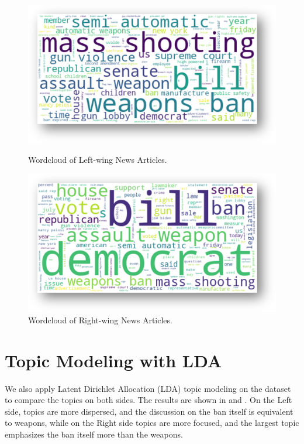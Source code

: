 \begin{figure}[ht]
    \centering
    \begin{minipage}[b]{0.45\textwidth}
        \includegraphics[width=\textwidth]{img/empirical-wordcloud-left}
        \caption{Wordcloud of Left-wing News Articles.}
        \label{fig:empirical-wordcloud-left}
    \end{minipage}
    \hfill
    \begin{minipage}[b]{0.45\textwidth}
        \includegraphics[width=\textwidth]{img/empirical-wordcloud-right}
        \caption{Wordcloud of Right-wing News Articles.}
        \label{fig:empirical-wordcloud-right}
    \end{minipage}
\end{figure}

\section{Topic Modeling with LDA}
\label{empirical-lda}
We also apply Latent Dirichlet Allocation (LDA) topic modeling on the dataset to compare the topics on both sides. The results are shown in  and . On the Left side, topics are more dispersed, and the discussion on the ban itself is equivalent to weapons, while on the Right side topics are more focused, and the largest topic emphasizes the ban itself more than the weapons.

